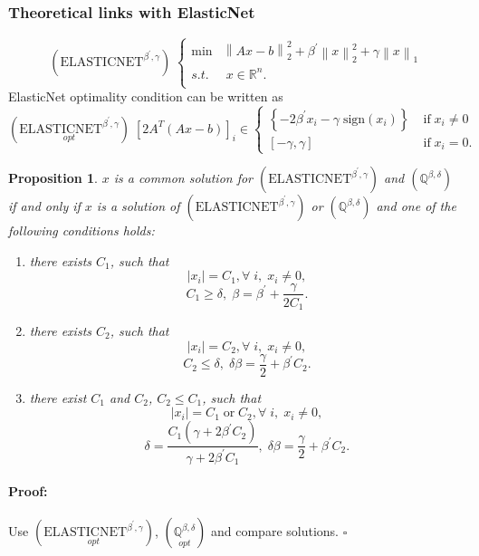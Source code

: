 \documentclass[fleqn]{report} %
\newcommand\ddfrac[2]{\frac{\displaystyle #1}{\displaystyle #2}}
\newtheorem{thm}{Proposition}[subsection]
\newenvironment{proof}{\paragraph{Proof:}}{\hfill$\square$}
\begin{document}
\subsubsection{Theoretical links with ElasticNet}
\begin{equation}
		\label{ElasticNet_Regularization}
		(\text{ELASTICNET}^{\beta^{\prime},\gamma})\;
		\left\{
		\begin{array}{ll}\min & \left\|Ax-b\right\|^2_2 + \beta^{\prime}\left\|x\right\|_2^2 + \gamma\left\|x\right\|_1\\
			s.t.&\;x\in\mathbb{R}^n.\\
		\end{array} 
		\right.
    \end{equation}
ElasticNet optimality condition can be written as
\[
\left(\underset{opt}{\text{ELASTICNET}^{\beta^{\prime},\gamma}}\right)\;\left[2A^T(Ax-b)\right]_i\in 
\left\{ \begin{array}{ll}
\left\{-2\beta^{\prime} x_i -\gamma\;\text{sign}(x_i)\right\} &\;\text{if}\; x_i\neq 0\\
\left[-\gamma,  \gamma\right]&\;\text{if}\; x_i =0.
\end{array}
\right.
\]
\begin{thm} $x$ is a common solution for $(\text{ELASTICNET}^{\beta^{\prime},\gamma})$ and $(\mathbb{Q}^{\beta,\delta} )$ if and only if 
$x$ is a solution of $(\text{ELASTICNET}^{\beta^{\prime},\gamma})$ or $(\mathbb{Q}^{\beta,\delta} )$ and 
one of the following conditions holds:
\begin{enumerate}
    \item there exists $C_1$, such that
\[\left|x_i\right|=C_1,\forall\;i,\;x_i\neq0,
\]
\[C_1 \geq \delta,\;\beta=\beta^{\prime} + \ddfrac{\gamma}{2C_1}.
\]
    \item there exists $C_2$, such that
\[\left|x_i\right|=C_2,\forall\;i,\;x_i\neq0,
\]
\[C_2 \leq \delta,\;\delta\beta=\ddfrac{\gamma}{2}+\beta^{\prime} C_2.
\]
    \item there exist $C_1$ and $C_2$, $C_2 \leq C_1$, such that
\[\left|x_i\right|=C_1\;\text{or}\;C_2,\forall\;i,\;x_i\neq0,
\]
\[ \delta = \ddfrac{C_1(\gamma+2\beta^{\prime} C_2)}{\gamma+2\beta^{\prime} C_1},\;\delta\beta=\ddfrac{\gamma}{2}+\beta^{\prime} C_2.
\]
\end{enumerate}\end{thm}
\begin{proof}
    Use $\left(\underset{opt}{\text{ELASTICNET}^{\beta^{\prime},\gamma}}\right)$,  $\left(\underset{opt}{\mathbb{Q}^{\beta,\delta}} \right)$ and compare solutions.
\end{proof}
\end{document}
